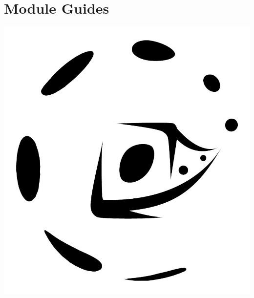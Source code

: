 \documentclass{memoir}\usepackage{etoolbox}\newtoggle{printable}\toggletrue{printable}\newtoggle{isBeamer}\togglefalse{isBeamer}
\begin{document}
\chapter{Module Guides}

\includegraphics[width=\textwidth]{GamesLogoAt}





\newpage


\newpage

\end{document}
